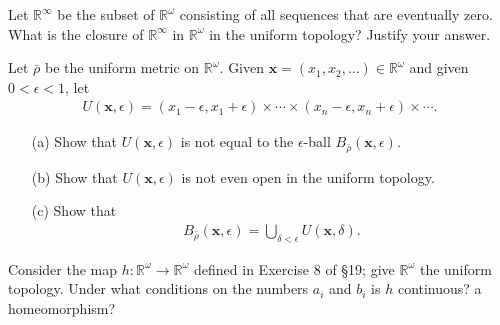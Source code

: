 \begin{exercise}[Munkres 20.5]
  Let $\mathbb{R}^\infty$ be the subset of $\mathbb{R}^\omega$ consisting of all sequences that are eventually zero. What is the closure of $\mathbb{R}^\infty$ in $\mathbb{R}^\omega$ in the uniform topology? Justify your answer.
\end{exercise}

\begin{exercise}[Munkres 20.6]
  Let $\bar{\rho}$ be the uniform metric on $\mathbb{R}^\omega$. Given $\mathbf{x} = (x_1, x_2, \ldots) \in \mathbb{R}^\omega$ and given $0 < \epsilon < 1$, let
  \begin{align*}
    U(\mathbf{x}, \epsilon) = (x_1 - \epsilon, x_1 + \epsilon) \times \cdots \times (x_n - \epsilon, x_n + \epsilon) \times \cdots.
  \end{align*}
  \begin{enumerate} 
    \item[(a)] Show that $U(\mathbf{x}, \epsilon)$ is not equal to the $\epsilon$-ball $B_{\bar{\rho}}(\mathbf{x}, \epsilon)$.
    \item[(b)] Show that $U(\mathbf{x}, \epsilon)$ is not even open in the uniform topology.
    \item[(c)] Show that
    \begin{align*}
      B_{\bar{\rho}}(\mathbf{x}, \epsilon) = \bigcup_{\delta < \epsilon} U(\mathbf{x}, \delta).
    \end{align*}
  \end{enumerate}
\end{exercise}

\begin{exercise}[Munkres 20.7]
  Consider the map $h : \mathbb{R}^\omega \to \mathbb{R}^\omega$ defined in Exercise 8 of \S19; give $\mathbb{R}^\omega$ the uniform topology. Under what conditions on the numbers $a_i$ and $b_i$ is $h$ continuous? a homeomorphism?
\end{exercise}

